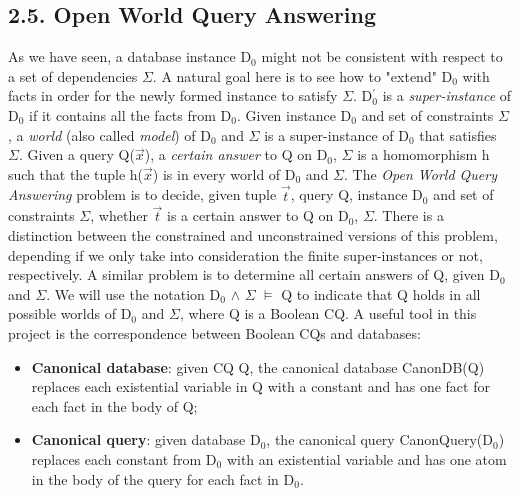 \documentclass[11pt, a4paper, dvipsnames]{article}
\begin{document}
\subsection{2.5. Open World Query Answering}
As we have seen, a database instance D$_{0}$ might not be consistent with respect to a set of dependencies $\Sigma$. A natural goal here is to see how to "extend" D$_{0}$ with facts in order for the newly formed instance to satisfy $\Sigma$.\newline
D$^{'}_{0}$ is a \textit{super-instance} of D$_{0}$ if it contains all the facts from D$_{0}$.  Given instance D$_{0}$ and set of constraints $\Sigma$, a \textit{world} (also called \textit{model}) of D$_{0}$ and $\Sigma$ is a super-instance of D$_{0}$ that satisfies $\Sigma$. Given a query Q($\vec{x}$), a \textit{certain answer} to Q on D$_{0}$, $\Sigma$ is a homomorphism h such that the tuple h($\vec{x}$) is in every world of D$_{0}$ and $\Sigma$. \newline
The \textit{Open World Query Answering} problem is to decide, given tuple $\vec{t}$, query Q, instance D$_{0}$ and set of constraints $\Sigma$, whether $\vec{t}$ is a certain answer to Q on D$_{0}$, $\Sigma$. There is a distinction between the constrained and unconstrained versions of this problem, depending if we only take into consideration the finite super-instances or not, respectively. A similar problem is to determine all certain answers of Q, given D$_{0}$ and $\Sigma$.\newline
We will use the notation D$_{0}$ $\wedge$ $\Sigma$ $\vDash$ Q to indicate that Q holds in all possible worlds of D$_{0}$ and $\Sigma$, where Q is a Boolean CQ.\newline
A useful tool in this project is the correspondence between Boolean CQs and databases:
\begin{itemize}
	\item \textbf{Canonical database}: given CQ Q, the canonical database CanonDB(Q) replaces each existential variable in Q with a constant and has one fact for each fact in the body of Q;
	\item \textbf{Canonical query}: given database D$_{0}$, the canonical query CanonQuery(D$_{0}$) replaces each constant from D$_{0}$ with an existential variable and has one atom in the body of the query for each fact in D$_{0}$.
\end{itemize}
\end{document}
